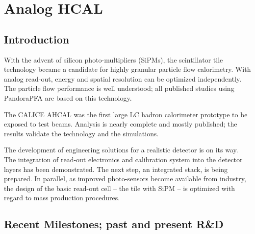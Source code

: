 \section{Analog HCAL}
\subsection{Introduction}
With the advent of silicon photo-multipliers (SiPMs), the scintillator tile technology became a candidate for highly granular particle flow calorimetry. With analog read-out, energy and spatial resolution can be optimized independently. The particle flow performance is well understood; all published studies using PandoraPFA are based on this technology.

The CALICE AHCAL was the first large LC hadron calorimeter prototype to be exposed to test beams. Analysis is nearly complete and mostly published; the results validate the technology and the simulations.

The development of engineering solutions for a realistic detector is on its way. The integration of read-out electronics and calibration system into the detector layers has been demonstrated. The next step, an integrated stack, is being prepared. In parallel, as improved photo-sensors become available from industry, the design of the basic read-out cell -- the tile with SiPM -- is optimized with regard to mass production procedures.

\subsection{Recent Milestones; past and present R\&D}
